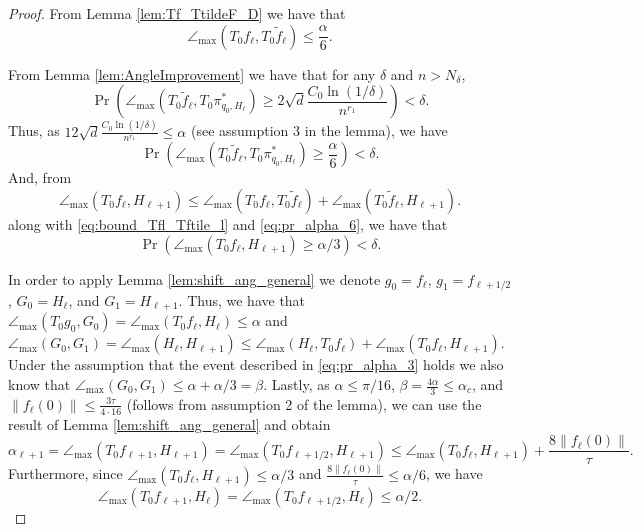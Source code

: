 \documentclass[12pt]{article}
\theoremstyle{remark}
\newcommand{\wtilde}[1]{\widetilde{#1}}
\newcommand{\maxangle}{\angle_{\max}}
\begin{document}
\begin{proof}
From Lemma \ref{lem:Tf_TtildeF_D} we have that 
\begin{equation}\label{eq:bound_Tfl_Tftile_l}
\maxangle(T_0 f_\ell, T_0 {\wtilde{f}_\ell}) 
\leq  
\frac{\alpha}{6}.    
\end{equation}

From Lemma \ref{lem:AngleImprovement} we have that for any $\delta$ and $n>N_{\delta}$, 
\[
\Pr(\maxangle(T_0\wtilde f_\ell, T_0\pi^*_{q_0, H_\ell}) \geq 2\sqrt{d}\frac{C_0 \ln(1/\delta)}{n^{r_1}}) < \delta.
\]
Thus, as $ 12\sqrt{d} \frac{C_0 \ln(1/\delta)}{n^{r_1}}\leq \alpha $  (see assumption 3 in the lemma), we have 
\begin{equation}\label{eq:pr_alpha_6}
\Pr(\maxangle(T_0\wtilde f_\ell, T_0\pi^*_{q_0, H_\ell}) \geq \frac{\alpha}{6}) < \delta.
\end{equation}
And, from
\[
\maxangle (T_0f_{\ell}, H_{\ell+1}) \leq \maxangle (T_0f_\ell, T_0\wtilde{f}_\ell)  + \maxangle (T_0\wtilde{f}_\ell, H_{\ell+1}). 
\]
along with \eqref{eq:bound_Tfl_Tftile_l} and \eqref{eq:pr_alpha_6}, we have that 
\begin{equation}\label{eq:pr_alpha_3}
\Pr\left(\maxangle (T_0f_{\ell}, H_{\ell+1}) \geq \alpha/3\right) < \delta.    
\end{equation}

In order to apply Lemma \ref{lem:shift_ang_general} we denote $g_0 = f_\ell$, $g_1 = f_{\ell+1/2}$, $G_0 = H_\ell$, and $G_1 = H_{\ell+1}$.
Thus, we have that $\maxangle (T_0g_0, G_0) = \maxangle (T_0f_\ell, H_\ell)\leq \alpha$ and  $\maxangle(G_0,G_1) = \maxangle(H_\ell,H_{\ell+1})\leq \maxangle(H_\ell,T_0f_\ell) + \maxangle(T_0f_\ell,H_{\ell+1})$.
Under the assumption that the event described in \eqref{eq:pr_alpha_3} holds we also know that $\maxangle(G_0,G_1)  \leq \alpha + \alpha/3 = \beta$.
Lastly, as $\alpha \leq \pi/16$, $\beta = \frac{4\alpha}{3} \leq \alpha_c$, and  $\|f_\ell(0)\| \leq \frac{3\tau}{4 \cdot 16} $ (follows from assumption 2 of the lemma), we can use the result of Lemma  \ref{lem:shift_ang_general} and obtain 
    \[
    \alpha_{\ell+1} = \maxangle (T_0f_{\ell+1}, H_{\ell+1}) = \maxangle (T_0f_{\ell+1/2}, H_{\ell+1}) \leq \maxangle(T_0f_\ell,H_{\ell+1})  + \frac{ 8\|f_\ell(0)\|}{\tau}  .\]
Furthermore, since $\maxangle(T_0f_\ell,H_{\ell+1}) \leq \alpha/3$ and $\frac{ 8\|f_\ell(0)\|}{\tau} \leq \alpha/6$, we have 
\[
\maxangle (T_0f_{\ell+1}, H_\ell)  = \maxangle (T_0f_{\ell+1/2}, H_\ell) \leq \alpha/2
.\]
\end{proof}
\end{document}
